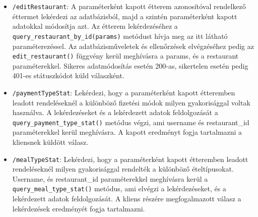 \begin{itemize}
\item \texttt{/editRestaurant}:
A paraméterként kapott étterem azonosítóval rendelkező éttermet lekérdezi az adatbázisból, majd a szintén paraméterként kapott adatokkal módosítja azt. Az étterem lekérdezéséhez a \texttt{query\_restaurant\_by\_id(params)} metódust hívja meg az itt látható paraméterezéssel. Az adatbázisműveletek és ellenőrzések elvégzéséhez pedig az \texttt{edit\_restaurant()} függvény kerül meghívásra a params, és a restaurant paraméterekkel. Sikeres adatmódosítás esetén 200-as, sikertelen esetén pedig 401-es státuszkódot küld válaszként.
\item \texttt{/paymentTypeStat}:
Lekérdezi, hogy a paraméterként kapott étteremben leadott rendeléseknél a különböző fizetési módok milyen gyakorisággal voltak használva. A lekérdezéseket és a lekérdezett adatok feldolgozását a \texttt{query\_\-payment\_\-type\_\-stat()} metódus végzi, ami username és restaurant\_id paraméterekkel kerül meghívásra. A kapott eredményt fogja tartalmazni a kliensnek küldött válasz.
\item \texttt{/mealTypeStat}:
Lekérdezi, hogy a paraméterként kapott étteremben leadott rendeléseknél milyen gyakorisággal rendelték a különböző ételtípusokat. Username, és restaurant\_id paraméterekkel meghívásra kerül a \texttt{query\_\-meal\_\-type\_\-stat()} metódus, ami elvégzi a lekérdezéseket, és a lekérdezett adatok feldolgozását. A kliens részére megfogalmazott válasz a lekérdezések eredményét fogja tartalmazni.
\end{itemize}
